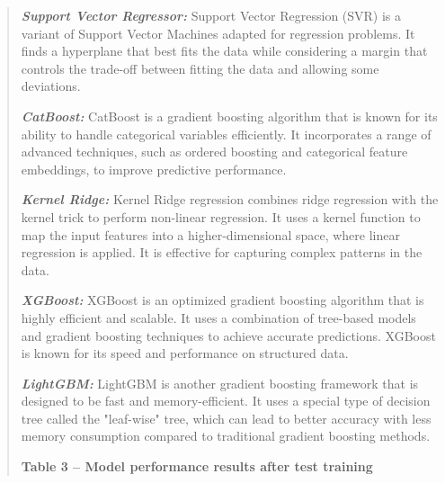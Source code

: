 \begin{quote}
\emph{\textbf{Support Vector Regressor:}} Support Vector Regression
(SVR) is a variant of Support Vector Machines adapted for regression
problems. It finds a hyperplane that best fits the data while
considering a margin that controls the trade-off between fitting the
data and allowing some deviations.

\emph{\textbf{CatBoost:}} CatBoost is a gradient boosting algorithm that
is known for its ability to handle categorical variables efficiently. It
incorporates a range of advanced techniques, such as ordered boosting
and categorical feature embeddings, to improve predictive performance.

\emph{\textbf{Kernel Ridge:}} Kernel Ridge regression combines ridge
regression with the kernel trick to perform non-linear regression. It
uses a kernel function to map the input features into a
higher-dimensional space, where linear regression is applied. It is
effective for capturing complex patterns in the data.

\emph{\textbf{XGBoost:}} XGBoost is an optimized gradient boosting
algorithm that is highly efficient and scalable. It uses a combination
of tree-based models and gradient boosting techniques to achieve
accurate predictions. XGBoost is known for its speed and performance on
structured data.

\emph{\textbf{LightGBM:}} LightGBM is another gradient boosting
framework that is designed to be fast and memory-efficient. It uses a
special type of decision tree called the "leaf-wise" tree, which can
lead to better accuracy with less memory consumption compared to
traditional gradient boosting methods.

\textbf{Table 3 -- Model performance results after test training}
\end{quote}

